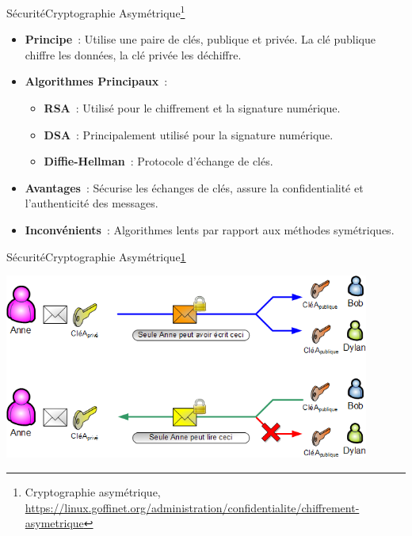 \documentclass{beamer}
\begin{document}
    \begin{frame}{Sécurité}{Cryptographie Asymétrique\footnote{\label{cryptoas-goffinet}Cryptographie asymétrique, \url{https://linux.goffinet.org/administration/confidentialite/chiffrement-asymetrique}}}
        \begin{itemize}
            \item \textbf{Principe}~: Utilise une paire de clés, publique et privée. La clé publique chiffre les données, la clé privée les déchiffre.
            \item \textbf{Algorithmes Principaux}~:
            \begin{itemize}
                \item \textbf{RSA}~: Utilisé pour le chiffrement et la signature numérique.
                \item \textbf{DSA}~: Principalement utilisé pour la signature numérique.
                \item \textbf{Diffie-Hellman}~: Protocole d'échange de clés.
            \end{itemize}
            \item \textbf{Avantages}~: Sécurise les échanges de clés, assure la confidentialité et l'authenticité des messages.
            \item \textbf{Inconvénients}~: Algorithmes lents par rapport aux méthodes symétriques.
        \end{itemize}
    \end{frame}

    \begin{frame}{Sécurité}{Cryptographie Asymétrique\cref{cryptoas-goffinet}}
        \begin{center}
            \includegraphics[width=12cm]{image/assymetrie-signature-vs-chiffrement}
        \end{center}
    \end{frame}
\end{document}
